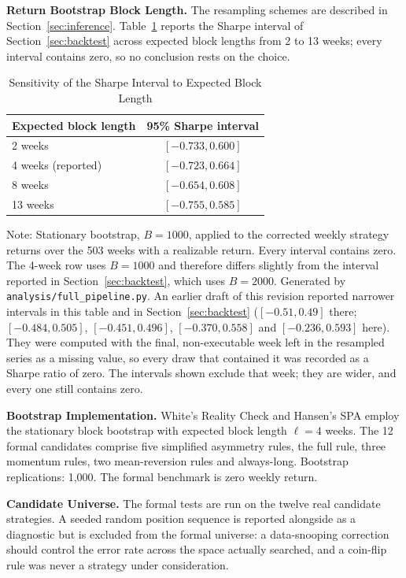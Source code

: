 \documentclass[11pt]{article}
\begin{document}
\textbf{Return Bootstrap Block Length.} The resampling schemes are described in Section~\ref{sec:inference}. Table~\ref{tab:blocklen} reports the Sharpe interval of Section~\ref{sec:backtest} across expected block lengths from 2 to 13 weeks; every interval contains zero, so no conclusion rests on the choice.

\begin{table}[H]
\centering
\caption{Sensitivity of the Sharpe Interval to Expected Block Length}
\label{tab:blocklen}
\small
\begin{tabular}{@{}lc@{}}
\toprule
Expected block length & 95\% Sharpe interval \\
\midrule
2 weeks & $[-0.733, 0.600]$ \\
4 weeks (reported) & $[-0.723, 0.664]$ \\
8 weeks & $[-0.654, 0.608]$ \\
13 weeks & $[-0.755, 0.585]$ \\
\bottomrule
\end{tabular}
\par\vspace{0.3em}
\parbox{\linewidth}{\footnotesize Note: Stationary bootstrap, $B = 1000$, applied to the corrected weekly strategy returns over the 503 weeks with a realizable return. Every interval contains zero. The 4-week row uses $B = 1000$ and therefore differs slightly from the interval reported in Section~\ref{sec:backtest}, which uses $B = 2000$. Generated by \texttt{analysis/full\_pipeline.py}. An earlier draft of this revision reported narrower intervals in this table and in Section~\ref{sec:backtest} ($[-0.51, 0.49]$ there; $[-0.484, 0.505]$, $[-0.451, 0.496]$, $[-0.370, 0.558]$ and $[-0.236, 0.593]$ here). They were computed with the final, non-executable week left in the resampled series as a missing value, so every draw that contained it was recorded as a Sharpe ratio of zero. The intervals shown exclude that week; they are wider, and every one still contains zero.}
\end{table}

\textbf{Bootstrap Implementation.} White's Reality Check and Hansen's SPA employ the stationary block bootstrap with expected block length $\ell = 4$ weeks. The 12 formal candidates comprise five simplified asymmetry rules, the full rule, three momentum rules, two mean-reversion rules and always-long. Bootstrap replications: 1,000. The formal benchmark is zero weekly return.

\textbf{Candidate Universe.} The formal tests are run on the twelve real candidate strategies. A seeded random position sequence is reported alongside as a diagnostic but is excluded from the formal universe: a data-snooping correction should control the error rate across the space actually searched, and a coin-flip rule was never a strategy under consideration.
\end{document}
